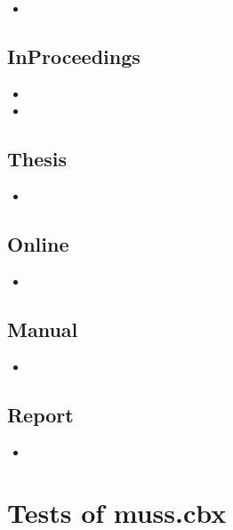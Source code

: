 \begin{itemize}
\item {}
\end{itemize}

\subsection{InProceedings}

\begin{itemize}
\item {}
\item {}
\end{itemize}

\subsection{Thesis}

\begin{itemize}
\item {}
\end{itemize}

\subsection{Online}

\begin{itemize}
\item {}
\end{itemize}

\subsection{Manual}

\begin{itemize}
\item {}
\end{itemize}

\subsection{Report}

\begin{itemize}
\item {}
\end{itemize}


\newpage

\section{Tests of muss.cbx}

